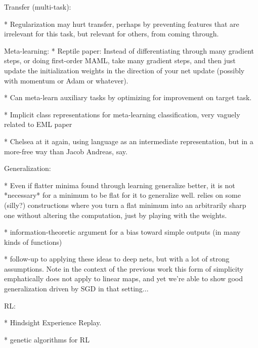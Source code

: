 Transfer (multi-task):

* Regularization may hurt transfer, perhaps by preventing features that are irrelevant for this task, but relevant for others, from coming through. \citep{Kornblith2019} 


Meta-learning:
* Reptile paper: Instead of differentiating through many gradient steps, or doing first-order MAML, take many gradient steps, and then just update the initialization weights in the direction of your net update (possibly with momentum or Adam or whatever). \citep{Nichol2018} 

* Can meta-learn auxiliary tasks by optimizing for improvement on target task. \citep{Liu2019a}

* Implicit class representations for meta-learning classification, very vaguely related to EML paper \citep{Ravichandran2019}

 * Chelsea at it again, using language as an intermediate representation, but in a more-free way than Jacob Andreas, say. \citep{Jiang2019}

Generalization:

* Even if flatter minima found through learning generalize better, it is not *necessary* for a minimum to be flat for it to generalize well. relies on some (silly?) constructions where you turn a flat minimum into an arbitrarily sharp one without altering the computation, just by playing with the weights. \citep{Dinh2017} 


* information-theoretic argument for a bias toward simple outputs (in many kinds of functions) \citep{Dingle2018}

* follow-up to \citep{Dingle2018} applying these ideas to deep nets, but with a lot of strong assumptions. \citep{Perez2019} Note in the context of the previous work this form of simplicity emphatically does not apply to linear maps, and yet we're able to show good generalization driven by SGD in that setting...  



RL:

* Hindsight Experience Replay. \citep{Andrychowicz2017}

* genetic algorithms for RL \citep{Petroski2018}


